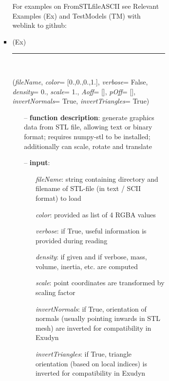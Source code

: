 \begin{itemize}[leftmargin=1.4cm]
\begin{itemize}[leftmargin=1.4cm]
\begin{itemize}[leftmargin=1.4cm]
\begin{itemize}[leftmargin=0.5cm]
\begin{itemize}[leftmargin=1.4cm]
\begin{itemize}[leftmargin=1.4cm]
\begin{itemize}[leftmargin=0.5cm]
\begin{itemize}[leftmargin=1.4cm]
\begin{itemize}[leftmargin=0.7cm]
\vspace{12pt}\end{itemize}
%
%
\noindent For examples on FromSTLfileASCII see Relevant Examples (Ex) and TestModels (TM) with weblink to github:
\bi
 \item \footnotesize {} (Ex)
\ei

%
\noindent\rule{8cm}{0.75pt}\vspace{1pt} \\ 
\begin{flushleft}
\label{sec:graphics:FromSTLfile}
({\it fileName}, {\it color}= [0.,0.,0.,1.], {\it verbose}= False, {\it density}= 0., {\it scale}= 1., {\it Aoff}= [], {\it pOff}= [], {\it invertNormals}= True, {\it invertTriangles}= True)
\end{flushleft}
\setlength{\itemindent}{0.7cm}
\begin{itemize}[leftmargin=0.7cm]
\item[--]
{\bf function description}: generate graphics data from STL file, allowing text or binary format; requires numpy-stl to be installed; additionally can scale, rotate and translate
\item[--]
{\bf input}: \vspace{-6pt}
\begin{itemize}[leftmargin=1.2cm]
\setlength{\itemindent}{-0.7cm}
\item[]{\it fileName}: string containing directory and filename of STL-file (in text / SCII format) to load
\item[]{\it color}: provided as list of 4 RGBA values
\item[]{\it verbose}: if True, useful information is provided during reading
\item[]{\it density}: if given and if verbose, mass, volume, inertia, etc. are computed
\item[]{\it scale}: point coordinates are transformed by scaling factor
\item[]{\it invertNormals}: if True, orientation of normals (usually pointing inwards in STL mesh) are inverted for compatibility in Exudyn
\item[]{\it invertTriangles}: if True, triangle orientation (based on local indices) is inverted for compatibility in Exudyn
\end{itemize}

\end{itemize}
\end{itemize}
\end{itemize}
\end{itemize}
\end{itemize}
\end{itemize}
\end{itemize}
\end{itemize}
\end{itemize}
